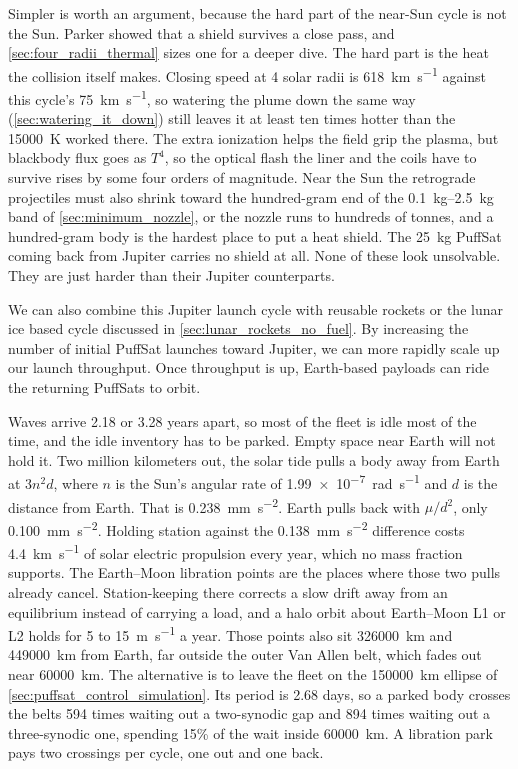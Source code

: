 \documentclass{article}
\begin{document}
Simpler is worth an argument, because the hard part of the near-Sun cycle is not the Sun. Parker showed that a shield survives a close pass, and \autoref{sec:four_radii_thermal} sizes one for a deeper dive. The hard part is the heat the collision itself makes. Closing speed at 4 solar radii is \SI{618}{\kilo\meter\per\second} against this cycle's \SI{75}{\kilo\meter\per\second}, so watering the plume down the same way (\autoref{sec:watering_it_down}) still leaves it at least ten times hotter than the \SI{15000}{\kelvin} worked there. The extra ionization helps the field grip the plasma, but blackbody flux goes as $T^4$, so the optical flash the liner and the coils have to survive rises by some four orders of magnitude. Near the Sun the retrograde projectiles must also shrink toward the hundred-gram end of the \SIrange{0.1}{2.5}{\kilo\gram} band of \autoref{sec:minimum_nozzle}, or the nozzle runs to hundreds of tonnes, and a hundred-gram body is the hardest place to put a heat shield. The \SI{25}{\kilo\gram} PuffSat coming back from Jupiter carries no shield at all. None of these look unsolvable. They are just harder than their Jupiter counterparts.

We can also combine this Jupiter launch cycle with reusable rockets or the lunar ice based cycle discussed in \autoref{sec:lunar_rockets_no_fuel}.  By increasing the number of initial PuffSat launches toward Jupiter, we can more rapidly scale up our launch throughput. Once throughput is up, Earth-based payloads can ride the returning PuffSats to orbit.

Waves arrive 2.18 or 3.28 years apart, so most of the fleet is idle most of the time, and the idle inventory has to be parked. Empty space near Earth will not hold it. Two million kilometers out, the solar tide pulls a body away from Earth at $3n^2 d$, where $n$ is the Sun's angular rate of \SI{1.99e-7}{\radian\per\second} and $d$ is the distance from Earth. That is \SI{0.238}{\milli\meter\per\second\squared}. Earth pulls back with $\mu/d^2$, only \SI{0.100}{\milli\meter\per\second\squared}. Holding station against the \SI{0.138}{\milli\meter\per\second\squared} difference costs \SI{4.4}{\kilo\meter\per\second} of solar electric propulsion every year, which no mass fraction supports. The Earth--Moon libration points are the places where those two pulls already cancel. Station-keeping there corrects a slow drift away from an equilibrium instead of carrying a load, and a halo orbit about Earth--Moon L1 or L2 holds for 5 to \SI{15}{\meter\per\second} a year. Those points also sit \SI{326000}{\kilo\meter} and \SI{449000}{\kilo\meter} from Earth, far outside the outer Van Allen belt, which fades out near \SI{60000}{\kilo\meter}. The alternative is to leave the fleet on the \SI{150000}{\kilo\meter} ellipse of \autoref{sec:puffsat_control_simulation}. Its period is 2.68 days, so a parked body crosses the belts 594 times waiting out a two-synodic gap and 894 times waiting out a three-synodic one, spending 15\% of the wait inside \SI{60000}{\kilo\meter}. A libration park pays two crossings per cycle, one out and one back.
\end{document}
